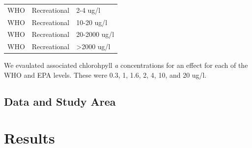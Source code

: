 \documentclass[11pt,]{article}
\begin{document}
\begin{longtable}[c]{@{}lll@{}}
\begin{minipage}[t]{0.11\columnwidth}
WHO
\strut\end{minipage} &
\begin{minipage}[t]{0.16\columnwidth}\raggedright\strut
Recreational
\strut\end{minipage} &
\begin{minipage}[t]{0.19\columnwidth}\raggedright\strut
2-4 ug/l
\strut\end{minipage}\tabularnewline
\begin{minipage}[t]{0.11\columnwidth}\raggedright\strut
WHO
\strut\end{minipage} &
\begin{minipage}[t]{0.16\columnwidth}\raggedright\strut
Recreational
\strut\end{minipage} &
\begin{minipage}[t]{0.19\columnwidth}\raggedright\strut
10-20 ug/l
\strut\end{minipage}\tabularnewline
\begin{minipage}[t]{0.11\columnwidth}\raggedright\strut
WHO
\strut\end{minipage} &
\begin{minipage}[t]{0.16\columnwidth}\raggedright\strut
Recreational
\strut\end{minipage} &
\begin{minipage}[t]{0.19\columnwidth}\raggedright\strut
20-2000 ug/l
\strut\end{minipage}\tabularnewline
\begin{minipage}[t]{0.11\columnwidth}\raggedright\strut
WHO
\strut\end{minipage} &
\begin{minipage}[t]{0.16\columnwidth}\raggedright\strut
Recreational
\strut\end{minipage} &
\begin{minipage}[t]{0.19\columnwidth}\raggedright\strut
\textgreater{}2000 ug/l
\strut\end{minipage}\tabularnewline
\bottomrule
\end{longtable}

We evaulated associated chlorohpyll \emph{a} concentrations for an
effect for each of the WHO and EPA levels. These were 0.3, 1, 1.6, 2, 4,
10, and 20 ug/l.

\subsection{Data and Study Area}\label{data-and-study-area}

\section{Results}\label{results}
\end{document}
